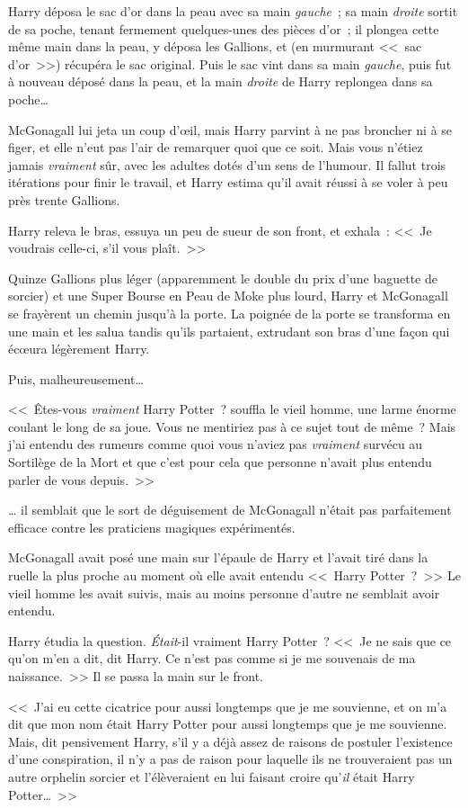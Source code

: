 Harry déposa le sac d'or dans la peau avec sa main \emph{gauche}~; sa main \emph{droite} sortit de sa poche, tenant fermement quelques-unes des pièces d'or~; il plongea cette même main dans la peau, y déposa les Gallions, et (en murmurant <<~sac d'or~>>) récupéra le sac original. Puis le sac vint dans sa main \emph{gauche}, puis fut à nouveau déposé dans la peau, et la main \emph{droite} de Harry replongea dans sa poche…

McGonagall lui jeta un coup d'œil, mais Harry parvint à ne pas broncher ni à se figer, et elle n'eut pas l'air de remarquer quoi que ce soit. Mais vous n'étiez jamais \emph{vraiment} sûr, avec les adultes dotés d'un sens de l'humour. Il fallut trois itérations pour finir le travail, et Harry estima qu'il avait réussi à se voler à peu près trente Gallions.

Harry releva le bras, essuya un peu de sueur de son front, et exhala~: <<~Je voudrais celle-ci, s'il vous plaît.~>>

Quinze Gallions plus léger (apparemment le double du prix d'une baguette de sorcier) et une Super Bourse en Peau de Moke  plus lourd, Harry et McGonagall se frayèrent un chemin jusqu'à la porte. La poignée de la porte se transforma en une main et les salua tandis qu'ils partaient, extrudant son bras d'une façon qui écœura légèrement Harry.

Puis, malheureusement…

<<~Êtes-vous \emph{vraiment} Harry Potter~? souffla le vieil homme, une larme énorme coulant le long de sa joue. Vous ne mentiriez pas à ce sujet tout de même~? Mais j'ai entendu des rumeurs comme quoi vous n'aviez pas \emph{vraiment} survécu au Sortilège de la Mort et que c'est pour cela que personne n'avait plus entendu parler de vous depuis.~>>

… il semblait que le sort de déguisement de McGonagall n'était pas parfaitement efficace contre les praticiens magiques expérimentés.

McGonagall avait posé une main sur l'épaule de Harry et l'avait tiré dans la ruelle la plus proche au moment où elle avait entendu <<~Harry Potter~?~>> Le vieil homme les avait suivis, mais au moins personne d'autre ne semblait avoir entendu.

Harry étudia la question. \emph{Était}-il vraiment Harry Potter~? <<~Je ne sais que ce qu'on m'en a dit, dit Harry. Ce n'est pas comme si je me souvenais de ma naissance.~>> Il se passa la main sur le front.

<<~J'ai eu cette cicatrice pour aussi longtemps que je me souvienne, et on m'a dit que mon nom était Harry Potter pour aussi longtemps que je me souvienne. Mais, dit pensivement Harry, s'il y a déjà assez de raisons de postuler l'existence d'une conspiration, il n'y a pas de raison pour laquelle ils ne trouveraient pas un autre orphelin sorcier et l'élèveraient en lui faisant croire qu'\emph{il} était Harry Potter…~>>


